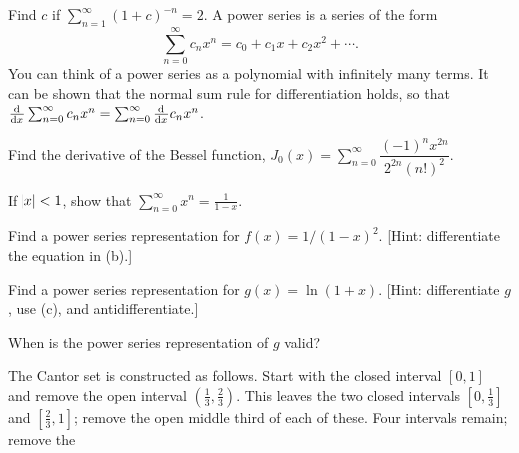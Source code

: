 \begin{questions}
  \questioE Find $ c $ if $ \sum_{n = 1}^\infty (1 + c)^{-n} = 2 $.
  \questioS A power series is a series of the form
            \begin{displaymath}
              \sum_{n = 0}^{\infty} c_n x^n = c_0 + c_1 x + c_2 x^2 + \cdots.
            \end{displaymath}
            You can think of a power series as a polynomial with infinitely many terms. It can be shown that the normal sum rule for differentiation holds,
            so that $ \od{}{x} \sum_{n = 0}^{\infty} c_n x^n = \sum_{n = 0}^{\infty} \od{}{x} c_n x^n $.
    \begin{parts}
      \item Find the derivative of the Bessel function, $ J_0(x) = \sum^{\infty}_{n = 0} \dfrac{(-1)^n x^{2n}}{2^{2n} (n!)^2} $.
      \item If $ \abs{x} < 1 $, show that $ \sum_{n = 0}^\infty x^n = \frac{1}{1 - x} $.
      \item Find a power series representation for $ f(x) = 1/(1-x)^2 $. [Hint: differentiate the equation in (b).]
      \item Find a power series representation for $ g(x) = \ln(1 + x) $. [Hint: differentiate $ g $, use (c), and antidifferentiate.]
      \item When is the power series representation of $ g $ valid?
    \end{parts}
  \questioS The Cantor set is constructed as follows. Start with the closed interval $ [0,1] $ and remove the open interval $ (\frac{1}{3}, \frac{2}{3}) $. This leaves
            the two closed intervals $ [0, \frac{1}{3}] $ and $ [\frac{2}{3},1] $; remove the open middle third of each of these. Four intervals remain; remove the

\end{questions}
